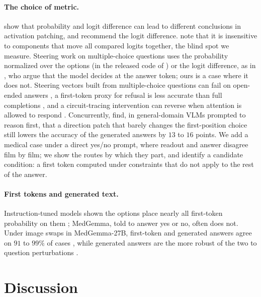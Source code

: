 \documentclass{article}
\begin{document}
\paragraph{The choice of metric.} \citet{zhang2024patching} show that probability and logit
difference can lead to different conclusions in activation patching, and recommend the logit
difference. \citet{heimersheim2024patching} note that it is insensitive to components that move all
compared logits together, the blind spot we measure. Steering work on multiple-choice questions uses
the probability normalized over the options (in the released code of \citealp{rimsky2024caa}) or the
logit difference, as in \citet{tan2024steering}, who argue that the model decides at the answer
token; ours is a case where it does not. Steering vectors built from multiple-choice questions can
fail on open-ended answers \citep{pres2024reliable}, a first-token proxy for refusal is less accurate
than full completions \citep{arditi2024refusal}, and a circuit-tracing intervention can reverse when
attention is allowed to respond \citep{lindsey2025biology}. Concurrently,
\citet{wang2026knowing} find, in general-domain VLMs prompted to reason first, that a direction patch
that barely changes the first-position choice still lowers the accuracy of the generated answers by
$13$ to $16$ points. We add a medical case under a direct yes/no prompt, where readout and answer
disagree film by film; we show the routes by which they part, and identify a candidate condition: a
first token computed under constraints that do not apply to the rest of the answer.

\paragraph{First tokens and generated text.} Instruction-tuned models shown the options place nearly
all first-token probability on them \citep{wiegreffe2023mass}; MedGemma, told to answer yes or no,
often does not. Under image swaps in MedGemma-27B, first-token and generated answers agree on $91$ to
$99\%$ of cases \citep{cajas2026modalens}, while generated answers are the more robust of the two to
question perturbations \citep{wang2024lookattext}.

\section{Discussion}
\label{sec:discussion}
\end{document}
